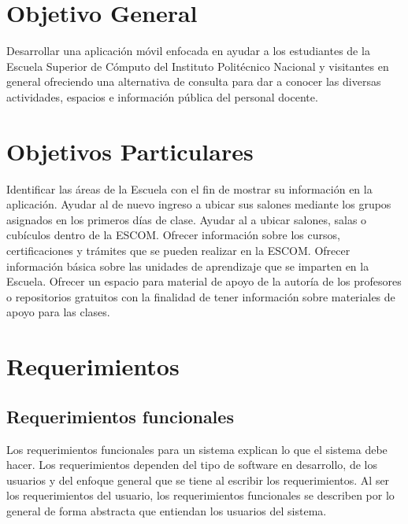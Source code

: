 \section{Objetivo General}

	Desarrollar una aplicación móvil enfocada en ayudar a los estudiantes de la Escuela Superior de Cómputo del Instituto Politécnico Nacional y visitantes en general ofreciendo una alternativa de consulta para dar a conocer las diversas actividades, espacios e información pública del personal docente.
	
	\section{Objetivos Particulares}	
	
	
	
	\begin{UClist}
		\UCli Identificar las áreas de la Escuela con el fin de mostrar su información en la aplicación.
		\UCli Ayudar al  de nuevo ingreso a ubicar sus salones mediante los grupos asignados en los primeros días de clase.
		\UCli Ayudar al  a ubicar salones, salas o cubículos dentro de la ESCOM.
		\UCli Ofrecer información sobre los cursos, certificaciones y trámites que se pueden realizar en la ESCOM.
		\UCli Ofrecer información básica sobre las unidades de aprendizaje que se imparten en la Escuela.
		\UCli Ofrecer un espacio para material de apoyo de la autoría de los profesores o repositorios gratuitos con la finalidad de tener información sobre materiales de apoyo para las clases.
	\end{UClist}
	
	\section{Requerimientos}
	\subsection{Requerimientos funcionales}
	
	Los requerimientos funcionales para un sistema explican lo que el sistema debe hacer. Los requerimientos dependen del tipo de software en desarrollo, de los usuarios y del enfoque general que se tiene al escribir los requerimientos. Al ser los requerimientos del usuario, los requerimientos funcionales se describen por lo general de forma abstracta que entiendan los usuarios del sistema. \cite{15}
	
